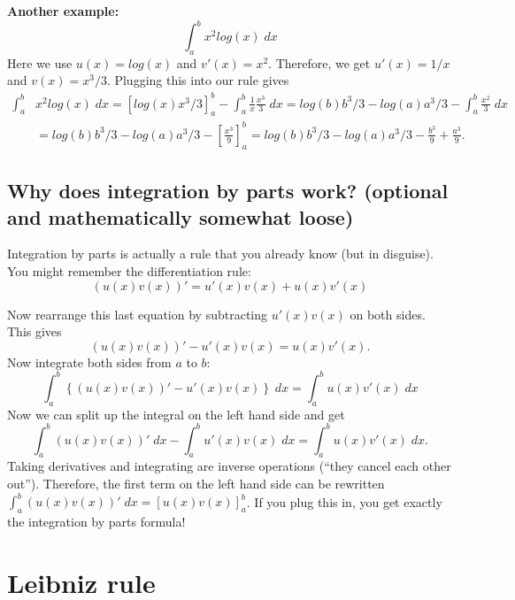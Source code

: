 \documentclass[a4paper,12pt]{article}
\begin{document}
\textbf{Another example: }
\begin{equation*}
  \int_a^b x^2 log(x)\;dx
\end{equation*}
Here we use $u(x)=log(x)$ and $v'(x)=x^2$. Therefore, we get $u'(x)=1/x$ and $v(x)=x^3/3$. Plugging this into our rule gives
\begin{align*}
  \int_a^b &x^2 log(x)\;dx=\left[log(x)x^3/3\right]_a^b- \int_a^b\frac{1}{x}\frac{x^3}{3}\;dx=log(b)b^3/3-log(a)a^3/3-\int_a^b\frac{x^2}{3}\;dx\\
&=log(b)b^3/3-log(a)a^3/3-\left[\frac{x^3}{9}\right]_a^b=log(b)b^3/3-log(a)a^3/3-\frac{b^3}{9}+\frac{a^3}{9}.
\end{align*}


\subsection{Why does integration by parts work? (optional and mathematically somewhat loose)}
\label{sec:why-doe-sintegration}
Integration by parts is actually a rule that you already know (but in disguise). You might remember the differentiation rule:
\begin{equation*}
  \left(u(x) v(x)\right)'=u'(x)v(x)+u(x)v'(x)
\end{equation*}

Now rearrange this last equation by subtracting $u'(x)v(x)$ on both sides. This gives
\begin{equation*}
  \left(u(x) v(x)\right)'-u'(x)v(x)=u(x)v'(x).
\end{equation*}
Now integrate both sides from $a$ to $b$:
\begin{equation*}
  \int_a^b\left\{(u(x) v(x))'-u'(x)v(x)\right\}\;dx=\int_a^bu(x)v'(x)\;dx
\end{equation*}
Now we can split up the integral on the left hand side and get
\begin{equation*}
  \int_a^b\left(u(x) v(x)\right)' \;dx-\int_a^bu'(x)v(x)\;dx=\int_a^bu(x)v'(x)\;dx.
\end{equation*}
Taking derivatives and integrating are inverse operations (``they cancel each other out''). Therefore, the first term on the left hand side can be rewritten $\int_a^b\left(u(x) v(x)\right)' \;dx=\left[ u(x) v(x)\right]_a^b$. If you plug this in, you get exactly the integration by parts formula!



\section{Leibniz rule}
\label{sec:leibniz-rule}
\end{document}
